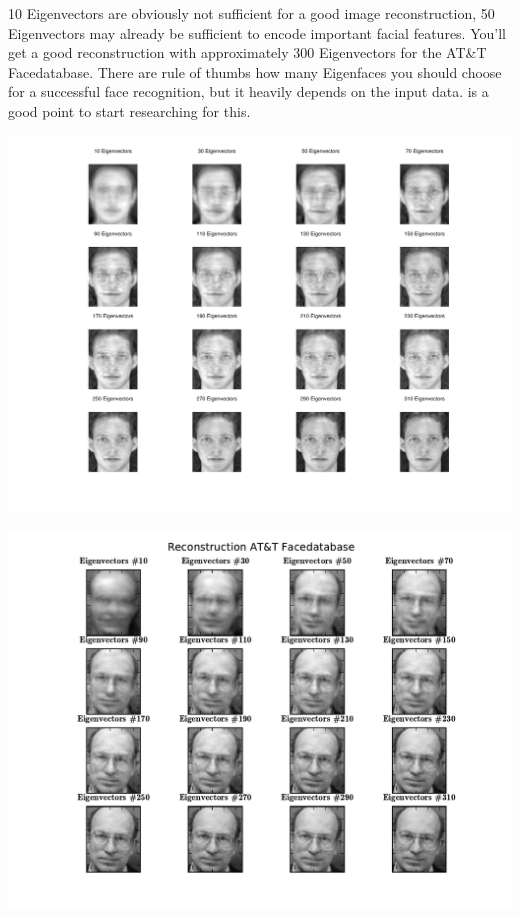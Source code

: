 10 Eigenvectors are obviously not sufficient for a good image reconstruction, 50 Eigenvectors may already be sufficient to encode important facial features. You'll get a good reconstruction with approximately 300 Eigenvectors for the AT\&T Facedatabase. There are rule of thumbs how many Eigenfaces you should choose for a successful face recognition, but it heavily depends on the input data. \cite{zhao2003frl} is a good point to start researching for this.

\ifx\python\undefined
	\begin{center}
		\includegraphics[scale=0.6]{img/eigenfaces/octave_pca_reconstruction}
	\end{center}
\else
	\begin{center}
		\includegraphics[scale=0.6]{img/eigenfaces/python_pca_reconstruction}
	\end{center}
\fi

